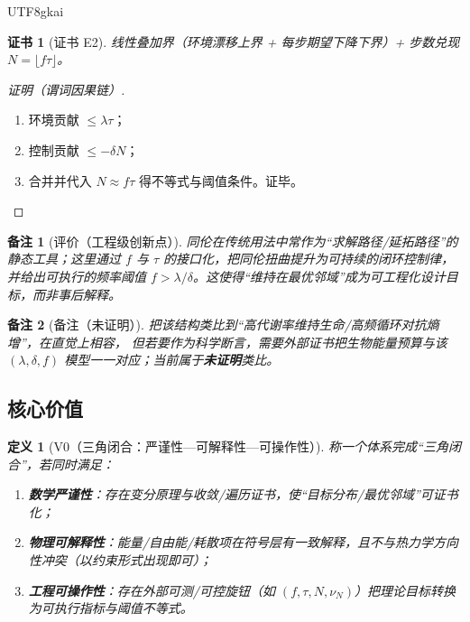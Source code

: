 \documentclass[12pt]{article}
\newtheorem{definition}{定义}[section]
\newtheorem{remark}{备注}[section]
\newtheorem{Certificate}{证书}[section]
\begin{document}
\begin{CJK*}{UTF8}{gkai}
\begin{Certificate}[证书 E2]
\label{cert:tex27-ch23-e2}
线性叠加界（环境漂移上界 + 每步期望下降下界）+ 步数兑现 $N=\lfloor f\tau\rfloor$。
\end{Certificate}

\begin{proof}[证明（谓词因果链）]
\begin{enumerate}
  \item 环境贡献 $\le \lambda\tau$；
  \item 控制贡献 $\le -\delta N$；
  \item 合并并代入 $N\approx f\tau$ 得不等式与阈值条件。证毕。
\end{enumerate}
\end{proof}

\begin{remark}[评价（工程级创新点）]
\label{rem:tex27-ch23-eng-eval}
同伦在传统用法中常作为“求解路径/延拓路径”的静态工具；这里通过 $f$ 与 $\tau$ 的接口化，把同伦扭曲提升为可持续的闭环控制律，
并给出可执行的频率阈值 $f>\lambda/\delta$。这使得“维持在最优邻域”成为可工程化设计目标，而非事后解释。
\end{remark}

\begin{remark}[备注（未证明）]
\label{rem:tex27-ch23-eng-unproved}
把该结构类比到“高代谢率维持生命/高频循环对抗熵增”，在直觉上相容，
但若要作为科学断言，需要外部证书把生物能量预算与该 $(\lambda,\delta,f)$ 模型一一对应；当前属于\textbf{未证明}类比。
\end{remark}

\subsection{核心价值}
\label{subsec:tex27-ch23-value}

\begin{definition}[V0（三角闭合：严谨性—可解释性—可操作性）]
\label{def:tex27-ch23-v0}
称一个体系完成“三角闭合”，若同时满足：
\begin{enumerate}
  \item \textbf{数学严谨性}：存在变分原理与收敛/遍历证书，使“目标分布/最优邻域”可证书化；
  \item \textbf{物理可解释性}：能量/自由能/耗散项在符号层有一致解释，且不与热力学方向性冲突（以约束形式出现即可）；
  \item \textbf{工程可操作性}：存在外部可测/可控旋钮（如 $(f,\tau,N,\nu_N)$）把理论目标转换为可执行指标与阈值不等式。
\end{enumerate}
\end{definition}


\end{CJK*}
\end{document}
